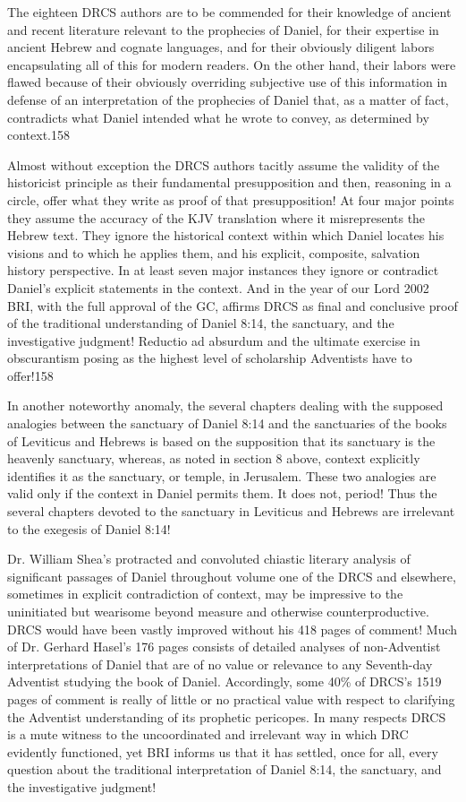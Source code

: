 The eighteen DRCS authors are to be commended for their knowledge of ancient
and recent literature relevant to the prophecies of Daniel, for their
expertise in ancient Hebrew and cognate languages, and for their obviously
diligent labors encapsulating all of this for modern readers. On the other
hand, their labors were flawed because of their obviously overriding
subjective use of this information in defense of an interpretation of the
prophecies of Daniel that, as a matter of fact, contradicts what Daniel
intended what he wrote to convey, as determined by context.158

Almost without exception the DRCS authors tacitly assume the validity of the
historicist principle as their fundamental presupposition and then,
reasoning in a circle, offer what they write as proof of that
presupposition! At four major points they assume the accuracy of the KJV
translation where it misrepresents the Hebrew text. They ignore the
historical context within which Daniel locates his visions and to which he
applies them, and his explicit, composite, salvation history perspective. In
at least seven major instances they ignore or contradict Daniel's explicit
statements in the context. And in the year of our Lord 2002 BRI, with the
full approval of the GC, affirms DRCS as final and conclusive proof of the
traditional understanding of Daniel 8:14, the sanctuary, and the 
investigative judgment! Reductio ad absurdum and the ultimate exercise in
obscurantism posing as the highest level of scholarship Adventists have to
offer!158

In another noteworthy anomaly, the several chapters dealing with the
supposed analogies between the sanctuary of Daniel 8:14 and the sanctuaries
of the books of Leviticus and Hebrews is based on the supposition that its
sanctuary is the heavenly sanctuary, whereas, as noted in section 8 above,
context explicitly identifies it as the sanctuary, or temple, in Jerusalem.
These two analogies are valid only if the context in Daniel permits them. It
does not, period! Thus the several chapters devoted to the sanctuary in
Leviticus and Hebrews are irrelevant to the exegesis of Daniel 8:14! 

Dr. William Shea's protracted and convoluted chiastic literary analysis of
significant passages of Daniel throughout volume one of the DRCS and
elsewhere, sometimes in explicit contradiction of context, may be impressive
to the uninitiated but wearisome beyond measure and otherwise
counterproductive. DRCS would have been vastly improved without his 418
pages of comment! Much of Dr. Gerhard Hasel's 176 pages consists of
detailed analyses of non-Adventist interpretations of Daniel that are of no
value or relevance to any Seventh-day Adventist studying the book of Daniel.
Accordingly, some 40\% of DRCS's 1519 pages of comment is really of little or
no practical value with respect to clarifying the Adventist understanding of
its prophetic pericopes. In many respects DRCS is a mute witness to the
uncoordinated and irrelevant way in which DRC evidently functioned, yet BRI
informs us that it has settled, once for all, every question about the
traditional interpretation of Daniel 8:14, the sanctuary, and the
investigative judgment!

